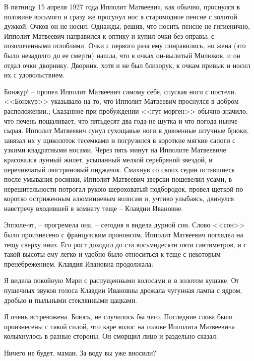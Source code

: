В пятницу 15 апреля 1927 года Ипполит Матвеевич, как обычно, проснулся в половине восьмого и сразу же просунул нос в старомодное пенсне с золотой дужкой.
Очков он не носил. Однажды, решив, что носить пенсне не гигиенично, Ипполит Матвеевич направился к оптику и купил очки без оправы, с позолоченными оглоблями.
Очки с первого раза ему понравились, но жена (это было незадолго до ее смерти) нашла, что в очках он-вылитый Милюков, и он отдал очки дворнику.
Дворник, хотя и не был близорук, к очкам привык и носил их с удовольствием.

\begin{itemizePaper}
    \item Бонжур! -- пропел Ипполит Матвеевич самому себе, спуская ноги с постели. <<Бонжур>> указывало на то,
    что Ипполит Матвеевич проснулся в добром расположении.;
    Сказанное при пробуждении <<гут морген>> обычно значило,
    что печень пошаливает, что пятьдесят два года-не шутка и
    что погода нынче сырая. Ипполит Матвеевич сунул сухощавые ноги в довоенные штучные брюки,
    завязал их у щиколоток тесемками и погрузился в короткие мягкие сапоги с узкими квадратными носами.
    Через пять минут на Ипполите Матвеевиче красовался лунный жилет, усыпанный мелкой серебряной звездой,
    и переливчатый люстриновый пиджачок.
    Смахнув со своих седин оставшиеся после умывания росинки,
    Ипполит Матвеевич зверски пошевелил усами, в нерешительности потрогал рукою шероховатый подбородок,
    провел щеткой по коротко остриженным алюминиевым волосам и, учтиво улыбаясь,
    двинулся навстречу входившей в комнату теще -- Клавдии Ивановне.
    \item Эпполе-эт, -- прогремела она, -- сегодня я видела дурной сон.
    Слово <<сон>> было произнесено с французским прононсом.
    Ипполит Матвеевич поглядел на тещу сверху вниз. Его рост доходил
    до ста восьмидесяти пяти сантиметров, и с такой высоты ему легко
    и удобно было относиться к теще с некоторым пренебрежением.
    Клавдия Ивановна продолжала:
    \item Я видела покойную Мари с распущенными волосами и в золотом кушаке.
    От пушечных звуков голоса Клавдии Ивановны дрожала чугунная лампа с ядром, дробью и пыльными стеклянными цацками.
    \item Я очень встревожена. Боюсь, не случилось бы чего.
    Последние слова были произнесены с такой силой, что каре волос на голове Ипполита Матвеевича колыхнулось в разные стороны. Он сморщил лицо и раздельно сказал:
    \item Ничего не будет, маман. За воду вы уже вносили?

\end{itemizePaper}
